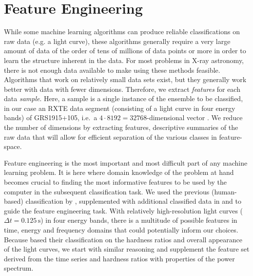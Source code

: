 \documentclass[12pt]{emulateapj}
\begin{document}
\section{Feature Engineering}

While some machine learning algorithms can produce reliable classifications on raw data (e.g. a light curve), these algorithms generally require a very large amount of data of the order of tens of millions of data points or more in order to learn the structure inherent in the data. 
For most problems in X-ray astronomy, there is not enough data available to make using these methods feasible. Algorithms that work on relatively small data sets exist, but they generally work better with data with fewer dimensions. Therefore, we extract \textit{features} for each data \textit{sample}. 
Here, a sample is a single instance of the ensemble to be classified, in our case an RXTE data segment (consisting of a light curve in four energy bands) of GRS1915+105, i.e.\ a $4 \cdot 8192 = 32768$-dimensional vector . We reduce the number of dimensions by extracting features, descriptive summaries of the raw data that will allow for efficient separation of the various classes in feature-space. 

Feature engineering is the most important and most difficult part of any machine learning problem. It is here where domain knowledge of the problem at hand becomes crucial to finding the most informative features to be used by the computer in the subsequent classification task. 
We used the previous (human-based) classification by \citet{belloni2000}, supplemented with additional classified data in \citet{kleinwolt2002} and \citet{hannikainen2003} to guide the feature engineering task. With relatively high-resolution light curves ($\Delta t = 0.125 \,\mathrm{s}$) in four energy bands, there is a multitude of possible features in time, energy and frequency domains that could potentially inform our choices. Because \citet{belloni2000} based their classification on the hardness ratios and overall appearance of the light curves, we start with similar reasoning and supplement the feature set derived from the time series and hardness ratios with properties of the power spectrum. 

\end{document}

